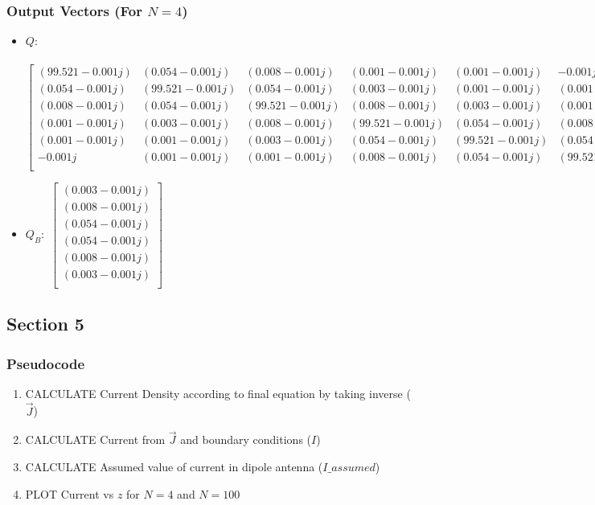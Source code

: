 \documentclass[12pt, a4paper]{article}
\begin{document}
\subsubsection{Output Vectors (For $N=4$)}
\begin{itemize}
    \item $
    Q $: \\ \\
    \hspace*{-1cm}
    \footnotesize
    $
    \begin{bmatrix}
    (99.521-0.001j) & (0.054-0.001j) & (0.008-0.001j) & (0.001-0.001j) & (0.001-0.001j) & -0.001j\\
    (0.054-0.001j) & (99.521-0.001j) & (0.054-0.001j) & (0.003-0.001j) & (0.001-0.001j) & (0.001-0.001j)\\
    (0.008-0.001j) & (0.054-0.001j) & (99.521-0.001j) & (0.008-0.001j) & (0.003-0.001j) & (0.001-0.001j)\\
    (0.001-0.001j) & (0.003-0.001j) & (0.008-0.001j) & (99.521-0.001j) & (0.054-0.001j) & (0.008-0.001j)\\
    (0.001-0.001j) & (0.001-0.001j) & (0.003-0.001j) & (0.054-0.001j) & (99.521-0.001j) & (0.054-0.001j)\\
    -0.001j & (0.001-0.001j) & (0.001-0.001j) & (0.008-0.001j) & (0.054-0.001j) & (99.521-0.001j)\\
    \end{bmatrix}
    $
    \normalsize
    \item $
    Q_{B} :$
    \footnotesize
    $\begin{bmatrix}
        (0.003-0.001j) \\ (0.008-0.001j) \\ (0.054-0.001j) \\ (0.054-0.001j) \\ (0.008-0.001j) \\ (0.003-0.001j)\\
        \end{bmatrix}
    $
    \normalsize
\end{itemize}
\subsection{Section 5}
\subsubsection{Pseudocode}
\begin{enumerate}
    \item \quad CALCULATE Current Density according to final equation by taking inverse ($\vec{J}$)
    \item \quad CALCULATE Current from $\vec{J}$ and boundary conditions ($I$)
    \item \quad CALCULATE Assumed value of current in dipole antenna ($I\_assumed$)
    \item \quad PLOT Current vs $z$ for $N=4$ and $N=100$ 
  \end{enumerate}
\end{document}
